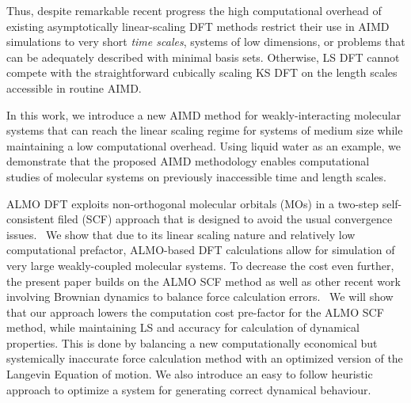 \documentclass[aps,prl,reprint,amsmath,amssymb]{revtex4-1}
\begin{document}
Thus, despite remarkable recent progress the high computational overhead of existing asymptotically linear-scaling DFT methods restrict their use in AIMD simulations to very short \emph{time scales}, systems of low dimensions, or problems that can be adequately described with minimal basis sets. Otherwise, LS DFT cannot compete with the straightforward cubically scaling KS DFT on the length scales accessible in routine AIMD.

In this work, we introduce a new AIMD method for weakly-interacting molecular systems that can reach the linear scaling regime for systems of medium size while maintaining a low computational overhead. Using liquid water as an example, we demonstrate that the proposed AIMD methodology enables computational studies of molecular systems on previously inaccessible time and length scales. 

ALMO DFT exploits non-orthogonal molecular orbitals (MOs) in a two-step self-consistent filed (SCF) approach that is designed to avoid the usual convergence issues.~\cite{a:ls-mauri-galli-car-1993,a:ls-ordejon-1995,a:ls-fattebert-2004,a:ls-rev-1999}
We show that due to its linear scaling nature and relatively low computational prefactor, ALMO-based DFT calculations allow for simulation of very large weakly-coupled molecular systems. 
To decrease the cost even further, the present paper builds on the ALMO SCF method as well as other recent work involving Brownian dynamics to balance force calculation errors.~\cite{a:ls-parinello,a:2ndcpmd,a:langevin-why} 
We will show that our approach lowers the computation cost pre-factor for the ALMO SCF method, while maintaining LS and accuracy for calculation of dynamical properties. 
This is done by balancing a new computationally economical but systemically inaccurate force calculation method with an optimized version of the Langevin Equation of motion. 
We also introduce an easy to follow heuristic approach to optimize a system for generating correct dynamical behaviour.
\end{document}
